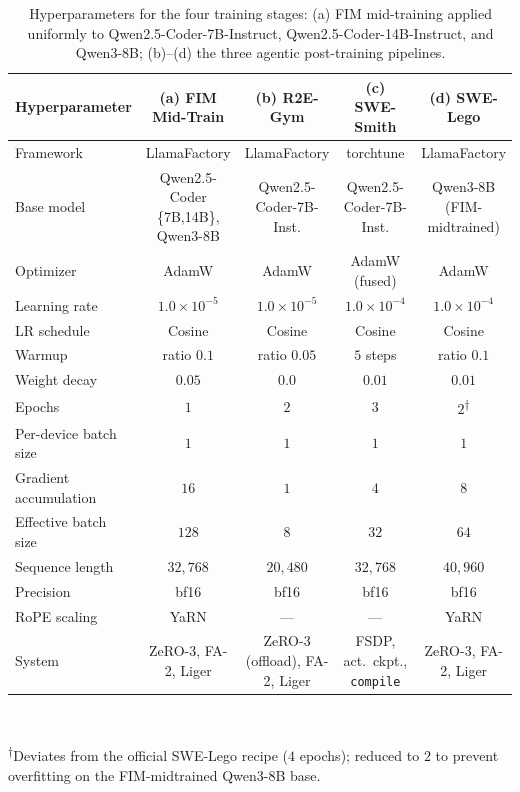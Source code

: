\begin{table}[h]
\centering
\footnotesize
\caption{Hyperparameters for the four training stages: (a) FIM
mid-training applied uniformly to Qwen2.5-Coder-7B-Instruct,
Qwen2.5-Coder-14B-Instruct, and Qwen3-8B; (b)--(d) the three agentic
post-training pipelines.}
\label{tab:hp}
\setlength{\tabcolsep}{4pt}
\begin{tabular}{lcccc}
\toprule
\textbf{Hyperparameter}
  & \textbf{(a) FIM Mid-Train}
  & \textbf{(b) R2E-Gym}
  & \textbf{(c) SWE-Smith}
  & \textbf{(d) SWE-Lego} \\
\midrule
Framework             & LlamaFactory & LlamaFactory & torchtune & LlamaFactory \\
Base model            & Qwen2.5-Coder \{7B,14B\}, Qwen3-8B
                      & Qwen2.5-Coder-7B-Inst.
                      & Qwen2.5-Coder-7B-Inst.
                      & Qwen3-8B (FIM-midtrained) \\
Optimizer             & AdamW & AdamW & AdamW (fused) & AdamW \\
Learning rate         & $1.0\!\times\!10^{-5}$
                      & $1.0\!\times\!10^{-5}$
                      & $1.0\!\times\!10^{-4}$
                      & $1.0\!\times\!10^{-4}$ \\
LR schedule           & Cosine & Cosine & Cosine & Cosine \\
Warmup                & ratio $0.1$ & ratio $0.05$ & $5$ steps & ratio $0.1$ \\
Weight decay          & $0.05$ & $0.0$ & $0.01$ & $0.01$ \\
Epochs                & $1$ & $2$ & $3$ & $2$\textsuperscript{$\dagger$} \\
Per-device batch size & $1$ & $1$ & $1$ & $1$ \\
Gradient accumulation & $16$ & $1$ & $4$ & $8$ \\
Effective batch size  & $128$ & $8$ & $32$ & $64$ \\
Sequence length       & $32{,}768$ & $20{,}480$ & $32{,}768$ & $40{,}960$ \\
Precision             & bf16 & bf16 & bf16 & bf16 \\
RoPE scaling          & YaRN & --- & --- & YaRN \\
System                & ZeRO-3, FA-2, Liger
                      & ZeRO-3 (offload), FA-2, Liger
                      & FSDP, act.\ ckpt., \texttt{compile}
                      & ZeRO-3, FA-2, Liger \\
\bottomrule
\end{tabular}
\\[0.3em]
{\raggedright \footnotesize \textsuperscript{$\dagger$}Deviates from the
official SWE-Lego recipe ($4$ epochs); reduced to $2$ to prevent
overfitting on the FIM-midtrained Qwen3-8B base.\par}
\end{table}

